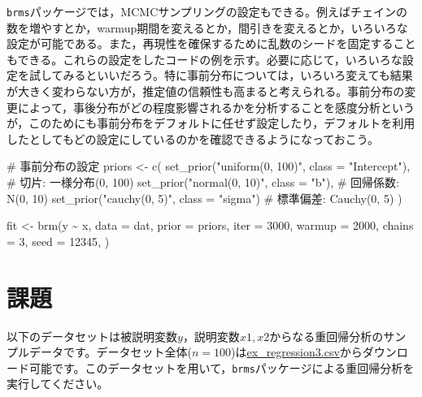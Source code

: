 \documentclass[
  a4paper,
]{ltjsbook}
\newenvironment{Shaded}{\begin{snugshade}}{\end{snugshade}}
\newcommand{\AttributeTok}[1]{\textcolor[rgb]{0.40,0.45,0.13}{#1}}
\newcommand{\CommentTok}[1]{\textcolor[rgb]{0.37,0.37,0.37}{#1}}
\newcommand{\DecValTok}[1]{\textcolor[rgb]{0.68,0.00,0.00}{#1}}
\newcommand{\FunctionTok}[1]{\textcolor[rgb]{0.28,0.35,0.67}{#1}}
\newcommand{\NormalTok}[1]{\textcolor[rgb]{0.00,0.23,0.31}{#1}}
\newcommand{\OtherTok}[1]{\textcolor[rgb]{0.00,0.23,0.31}{#1}}
\newcommand{\SpecialCharTok}[1]{\textcolor[rgb]{0.37,0.37,0.37}{#1}}
\newcommand{\StringTok}[1]{\textcolor[rgb]{0.13,0.47,0.30}{#1}}
\begin{document}
\texttt{brms}パッケージでは，MCMCサンプリングの設定もできる。例えばチェインの数を増やすとか，warmup期間を変えるとか，間引きを変えるとか，いろいろな設定が可能である。また，再現性を確保するために乱数のシードを固定することもできる。これらの設定をしたコードの例を示す。必要に応じて，いろいろな設定を試してみるといいだろう。特に事前分布については，いろいろ変えても結果が大きく変わらない方が，推定値の信頼性も高まると考えられる。事前分布の変更によって，事後分布がどの程度影響されるかを分析することを感度分析というが，このためにも事前分布をデフォルトに任せず設定したり，デフォルトを利用したとしてもどの設定にしているのかを確認できるようになっておこう。

\begin{Shaded}
\begin{Highlighting}[]
\CommentTok{\# 事前分布の設定}
\NormalTok{priors }\OtherTok{\textless{}{-}} \FunctionTok{c}\NormalTok{(}
  \FunctionTok{set\_prior}\NormalTok{(}\StringTok{"uniform(0, 100)"}\NormalTok{, }\AttributeTok{class =} \StringTok{"Intercept"}\NormalTok{), }\CommentTok{\# 切片: 一様分布(0, 100)}
  \FunctionTok{set\_prior}\NormalTok{(}\StringTok{"normal(0, 10)"}\NormalTok{, }\AttributeTok{class =} \StringTok{"b"}\NormalTok{), }\CommentTok{\# 回帰係数: N(0, 10)}
  \FunctionTok{set\_prior}\NormalTok{(}\StringTok{"cauchy(0, 5)"}\NormalTok{, }\AttributeTok{class =} \StringTok{"sigma"}\NormalTok{) }\CommentTok{\# 標準偏差: Cauchy(0, 5)}
\NormalTok{)}

\NormalTok{fit }\OtherTok{\textless{}{-}} \FunctionTok{brm}\NormalTok{(y }\SpecialCharTok{\textasciitilde{}}\NormalTok{ x,}
  \AttributeTok{data =}\NormalTok{ dat,}
  \AttributeTok{prior =}\NormalTok{ priors,}
  \AttributeTok{iter =} \DecValTok{3000}\NormalTok{,}
  \AttributeTok{warmup =} \DecValTok{2000}\NormalTok{,}
  \AttributeTok{chains =} \DecValTok{3}\NormalTok{,}
  \AttributeTok{seed =} \DecValTok{12345}\NormalTok{,}
\NormalTok{)}
\end{Highlighting}
\end{Shaded}

\section{課題}\label{ux8ab2ux984c-10}

以下のデータセットは被説明変数\(y\)，説明変数\(x1,x2\)からなる重回帰分析のサンプルデータです。データセット全体(\(n=100\))は\href{ex_regression1.csv}{ex\_regression3.csv}からダウンロード可能です。このデータセットを用いて，\texttt{brms}パッケージによる重回帰分析を実行してください。
\end{document}
